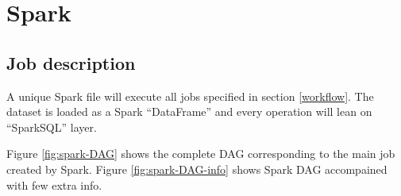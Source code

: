 \chapter{Spark}

\section{Job description}

A unique Spark file will execute all jobs specified in section \ref{workflow}. The dataset is loaded as a Spark ``DataFrame'' and every operation will lean on ``SparkSQL'' layer.

Figure \ref{fig:spark-DAG} shows the complete DAG corresponding to the main job created by Spark. Figure \ref{fig:spark-DAG-info} shows Spark DAG accompained with few extra info.


